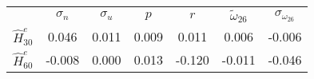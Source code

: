 \begin{tabular}{l*{6}{c}} \toprule 
& $\sigma_{n}$ & $\sigma_{u}$ & $p$ & $r$ & $\tilde{\omega}_{26}$ & $\sigma_{\omega_{26}}$ \\ \cmidrule(lr){2-7} 
 $\hat{H}_{30}^{e}$& 0.046 & 0.011 & 0.009 & 0.011 & 0.006 & -0.006 \\ 
 $\hat{H}_{60}^{e}$& -0.008 & 0.000 & 0.013 & -0.120 & -0.011 & -0.046 \\ \bottomrule 
 \end{tabular}